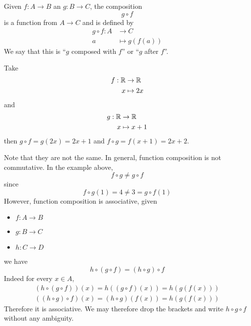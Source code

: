 \documentclass{article}
\begin{document}
\begin{defi}
    Given $f: A \rightarrow B$ an $g: B \rightarrow C$, the composition
    \[
        g \circ f
    \]
    is a function from $A \rightarrow C$ and is defined by
    \begin{align*}
        g \circ f : A &\rightarrow C \\
        a &\mapsto g(f(a))
    \end{align*}
    We say that this is ``$g$ composed with $f$'' or ``$g$ after $f$''.
\end{defi}
\begin{eg}
    Take
    \begin{align*}
        f: \mathbb{R} &\rightarrow \mathbb{R} \\
        x &\mapsto 2x
    \end{align*}
    and
    \begin{align*}
        g: \mathbb{R} &\rightarrow \mathbb{R} \\
        x &\mapsto x + 1
    \end{align*}
    then $g \circ f = g(2x) = 2x + 1$ and $f \circ g = f(x + 1) = 2x + 2$.
\end{eg}
\begin{remark}
    Note that they are not the same. 
    In general, function composition is not commutative.
    In the example above, 
    \[
        f \circ g \neq g \circ f  
    \]
    since
    \[
        f \circ g(1) = 4 \neq 3 = g \circ f(1) 
    \]
    However, function composition is associative, given 
    \begin{itemize}
        \item $f: A \rightarrow B$
        \item $g: B \rightarrow C$ 
        \item $h: C \rightarrow D$
    \end{itemize}
    we have 
    \[
        h \circ (g \circ f) = (h \circ g) \circ f  
    \]
    Indeed for every $x \in A$,
    \begin{align*}
        (h \circ (g \circ f))(x) = h((g \circ f)(x)) = h(g(f(x))) \\
        ((h \circ g) \circ f)(x) = (h \circ g)(f(x)) = h(g(f(x)))
    \end{align*}
    Therefore it is associative.
    We may therefore drop the brackets and write $h \circ g \circ f$ without any ambiguity.
\end{remark}
\end{document}

